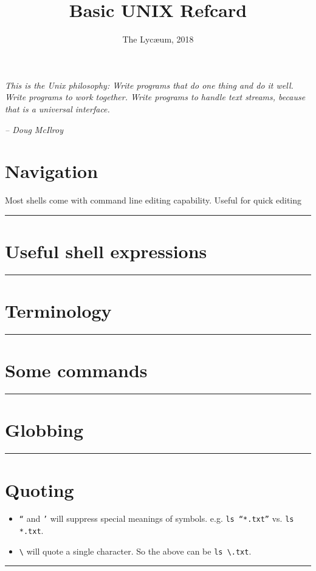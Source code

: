 \documentclass{../refsheet}
\title{Basic UNIX Refcard}
\author{The Lyc\ae{}um, 2018}
\date{}
\begin{document}
\maketitle
\epigraph{\textit{This is the Unix philosophy: Write programs that do one
  thing and do it well. Write programs to work together. Write
  programs to handle text streams, because that is a universal
  interface.}}{\textit{-- Doug McIlroy}}
\section{Navigation}
Most shells come with command line editing capability. Useful for
quick editing

\noindent\rule{\linewidth}{0.05ex}

\section{Useful shell expressions}

\noindent\rule{\linewidth}{0.05ex}

\section{Terminology}

\noindent\rule{\linewidth}{0.05ex}

\section{Some commands}

\noindent\rule{\linewidth}{0.05ex}

\section{Globbing}

\noindent\rule{\linewidth}{0.05ex}

\section{Quoting}
\begin{itemize}
\item \texttt{``} and \texttt{'} will suppress special meanings of
  symbols. e.g. \texttt{ls ``*.txt''}  vs. \texttt{ls *.txt}.
\item \texttt{\textbackslash} will quote a single character. So the above can be
  \texttt{ls \textbackslash*.txt}.
\end{itemize}
\noindent\rule{\linewidth}{0.05ex}
\end{document}
